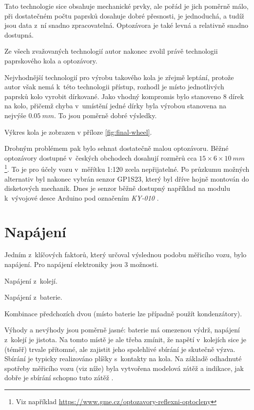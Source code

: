 Tato technologie sice obsahuje mechanické prvky, ale pořád je jich poměrně
málo, při dostatečném počtu paprsků dosahuje dobré přesnosti, je jednoduchá, a
tudíž jsou data z~ní snadno zpracovatelná. Optozávora je také levná a relativně
snadno dostupná.

Ze všech zvažovaných technologií autor nakonec zvolil právě technologii
paprskového kola a optozávory.

Nejvhodnější technologií pro výrobu takového kola je zřejmě leptání, protože
autor však nemá k~této technologii přístup, rozhodl je místo jednotlivých
paprsků kolo vyrobit dírkované. Jako vhodný kompromis bylo stanoveno
8 dírek na kolo, přičemž chyba v~umístění jedné dírky byla výrobou stanovena na
nejvýše $0.05\ mm$. To jsou poměrně dobré výsledky.

Výkres kola je zobrazen v příloze \ref{fig:final-wheel}.

Drobným problémem pak bylo sehnat dostatečně malou optozávoru. Běžné optozávory
dostupné v~českých obchodech dosahují rozměrů cca $15\times6\times10\ mm$
\footnote{Viz například
\url{https://www.gme.cz/optozavory-reflexni-optocleny}}. To je pro účely vozu
v~měřítku 1:120 zcela nepřijatelné. Po
průzkumu možných alternativ byl nakonec vybrán senzor
GP1S23\cite{gp1s23:datasheet}, který byl dříve hojně montován do disketových
mechanik. Dnes je senzor běžně dostupný například na modulu k~vývojové desce
Arduino pod označením \textit{KY-010} \cite{ky-010}.

\section{Napájení}
\label{sec:wsm-napajeni}

Jedním z~klíčových faktorů, který určoval výslednou podobu měřicího vozu, bylo
napájení. Pro napájení elektroniky jsou 3 možnosti.

\begin{compactenum}
\item Napájení z~kolejí.
\item Napájení z~baterie.
\item Kombinace předchozích dvou (místo baterie lze případně použít kondenzátory).
\end{compactenum}

Výhody a nevýhody jsou poměrně jasné: baterie má omezenou výdrž, napájení
z~kolejí je jistota. Na tomto místě je ale třeba zmínit, že napětí v~kolejích
sice je (téměř) trvale přítomné, ale zajistit jeho spolehlivé sbírání je
skutečně výzva. Sbírání je typicky realizováno plíšky s~kontakty na kola.
Na základě odhadnuté spotřeby měřicího vozu (viz níže) byla vytvořena modelová
zátěž a indikace, jak dobře je sbírání schopno tuto zátěž .

